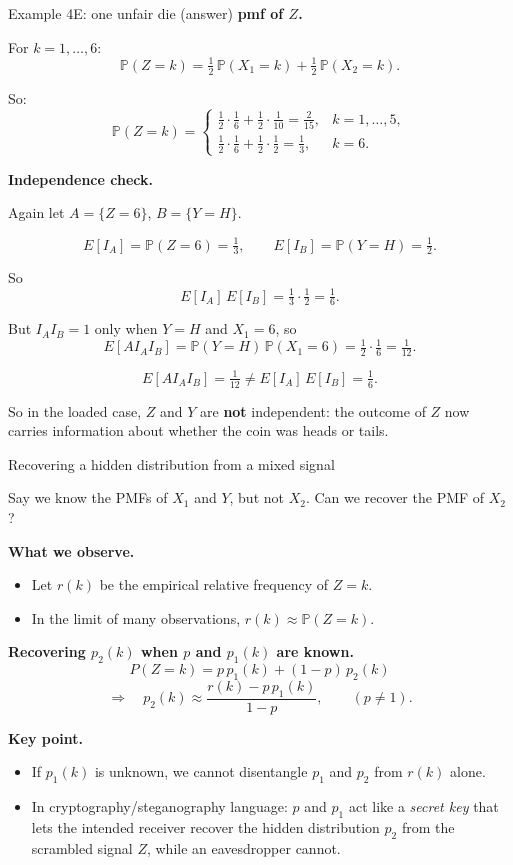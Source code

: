 \documentclass[t,8pt]{beamer}
\begin{document}
\begin{frame}{Example 4E: one unfair die (answer)}
	\small
	\textbf{pmf of $Z$.}
	
	For $k=1,\dots,6$:
	\[
	\mathbb P(Z = k)
	= \tfrac12\,\mathbb P(X_1=k) + \tfrac12\,\mathbb P(X_2=k).
	\]
	
	So:
	\[
	\mathbb P(Z = k)
	=
	\begin{cases}
		\tfrac12 \cdot \tfrac16 + \tfrac12 \cdot \tfrac1{10}
		= \tfrac{2}{15}, & k=1,\dots,5,\\[4pt]
		\tfrac12 \cdot \tfrac16 + \tfrac12 \cdot \tfrac12
		= \tfrac{1}{3}, & k=6.
	\end{cases}
	\]
	
	\medskip
	\textbf{Independence check.}
	
	Again let $A=\{Z=6\}$, $B=\{Y=H\}$.
	
	\[
	E[I_A] = \mathbb P(Z=6) = \tfrac{1}{3},\qquad
	E[I_B] = \mathbb P(Y=H) = \tfrac12.
	\]
	
	So
	\[
	E[I_A]\,E[I_B] = \tfrac{1}{3}\cdot\tfrac12 = \tfrac{1}{6}.
	\]
	
	But $I_A I_B = 1$ only when $Y=H$ and $X_1=6$, so
	\[
	E[AI_A I_B]
	= \mathbb P(Y=H)\,\mathbb P(X_1=6)
	= \tfrac12 \cdot \tfrac16
	= \tfrac{1}{12}.
	\]
	
	\[
	E[AI_A I_B] = \tfrac{1}{12}
	\neq
	E[I_A]\,E[I_B] = \tfrac{1}{6}.
	\]
	
	So in the loaded case, $Z$ and $Y$ are \textbf{not} independent:  
	the outcome of $Z$ now carries information about whether the coin was heads or tails.
\end{frame}

\begin{frame}{Recovering a hidden distribution from a mixed signal}
	
	Say we know the PMFs of $X_1$ and $Y$, but not $X_2$. Can we recover the PMF of $X_2$?
	
	\medskip
	\textbf{What we observe.}
	\begin{itemize}
		\item Let $r(k)$ be the empirical relative frequency of $Z=k$.
		\item In the limit of many observations, $r(k) \approx \mathbb{P}(Z=k)$.
	\end{itemize}
	
	\medskip
	\textbf{Recovering $p_2(k)$ when $p$ and $p_1(k)$ are known.}
	\[
	P(Z=k) = p\,p_1(k) + (1-p)\,p_2(k)
	\]
	\[
	\Rightarrow\quad p_2(k) \approx \frac{r(k) - p\,p_1(k)}{1-p}, \qquad (p \neq 1).
	\]
	
	\medskip
	\textbf{Key point.}
	\begin{itemize}
		\item If $p_1(k)$ is unknown, we cannot disentangle $p_1$ and $p_2$ from $r(k)$ alone.
		\item In cryptography/steganography language: $p$ and $p_1$ act like a \emph{secret key} that lets the intended receiver recover the hidden distribution $p_2$ from the scrambled signal $Z$, while an eavesdropper cannot.
	\end{itemize}
	
\end{frame}
\end{document}
